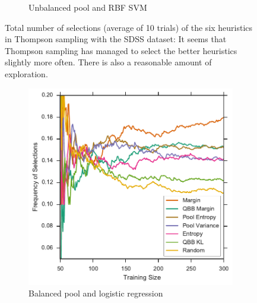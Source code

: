\begin{figure}[p]
\begin{subfigure}{.5\textwidth}
        \caption{Unbalanced pool and RBF SVM}
        \label{fig:sdss_ur_no_selections}
    \end{subfigure}
    \caption[Total number of heuristic selections (SDSS)]{Total number of selections (average of 10
        trials) of the six heuristics in Thompson sampling with the SDSS dataset: It seems that
        Thompson sampling has managed to select the better heuristics slightly more often. There is also a
        reasonable amount of exploration.} \label{fig:sdss_no_selections}
\end{figure}


\begin{figure}[p]
	\centering
	\begin{subfigure}{.5\textwidth}
		\centering
		\includegraphics[width=\textwidth]{figures/5_thompson/sdss_bl_frequencies}
		\caption{Balanced pool and logistic regression}
		\label{fig:sdss_bl_frequencies}
	\end{subfigure}%
	\begin{subfigure}{.5\textwidth}
		\centering

\end{subfigure}
\end{figure}
